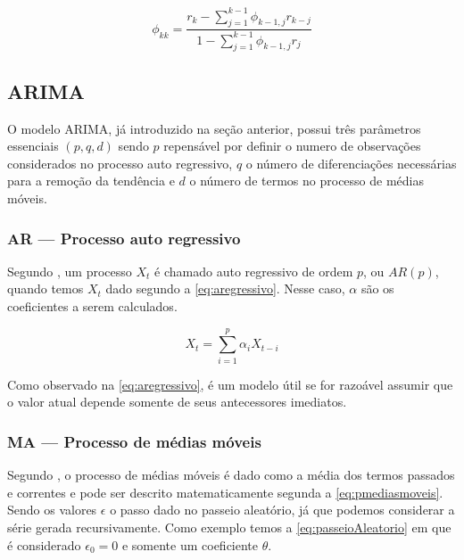 \documentclass[
    12pt,
    oneside,
    a4paper,
    english,
    brazil
]{abntex2}
\begin{document}
\begin{equation}
    \label{eq:facp}
    \phi_{kk} = \frac{r_k-\sum_{j=1}^{k-1}{\phi_{k-1,j}r_{k-j}}}{1-\sum_{j=1}^{k-1}{\phi_{k-1,j}r_{j}}}
\end{equation}

\subsection{ARIMA}

O  modelo  ARIMA, já  introduzido  na seção  anterior, possui  três  parâmetros
essenciais $(p,q,d)$ sendo  $p$ repensável por definir o  numero de observações
considerados  no  processo auto  regressivo,  $q$  o número  de  diferenciações
necessárias para a remoção da tendência e $d$ o número de termos no processo de
médias móveis.

\subsubsection{AR --- Processo auto regressivo}


Segundo  , um  processo  $X_t$  é  chamado  auto  regressivo
de   ordem   $p$,   ou   $AR(p)$,   quando   temos   $X_t$   dado   segundo   a
\autoref{eq:aregressivo}.  Nesse caso, $\alpha$  são  os  coeficientes a  serem
calculados.

\begin{equation}
    \label{eq:aregressivo}
    X_t = \sum_{i = 1}^{p}{\alpha_{i}X_{t-i}}
\end{equation}

Como observado  na \autoref{eq:aregressivo}, é  um modelo útil se  for razoável
assumir que o valor atual depende somente de seus antecessores imediatos.

\subsubsection{MA --- Processo de médias móveis}


Segundo , o processo de médias móveis é dado como
a média  dos termos passados  e correntes  e pode ser  descrito matematicamente
segunda a \autoref{eq:pmediasmoveis}. Sendo os  valores $\epsilon$ o passo dado
no passeio aleatório, já que  podemos considerar a série gerada recursivamente.
Como   exemplo   temos   a  \autoref{eq:passeioAleatorio}  em que é considerado
$\epsilon_0 = 0$ e somente um coeficiente $\theta$.
\end{document}
